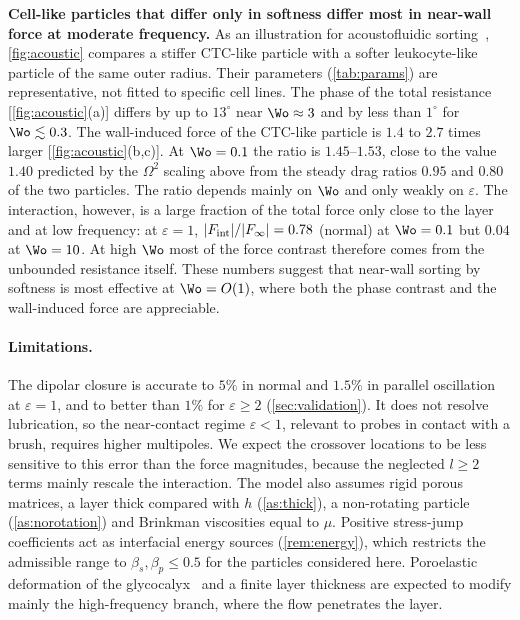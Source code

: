 \textbf{Cell-like particles that differ only in softness differ most in near-wall force at moderate frequency.} As an
illustration for acoustofluidic sorting~\cite{wu2019acoustofluidic,hossein2023review}, \cref{fig:acoustic} compares a
stiffer CTC-like particle with a softer leukocyte-like particle of the same outer radius. Their parameters
(\cref{tab:params}) are representative, not fitted to specific cell lines. The phase of the total resistance
[\cref{fig:acoustic}(a)] differs by up to $13^\circ$ near $\Wo\approx3$ and by less than $1^\circ$ for $\Wo\lesssim0.3$.
The wall-induced force of the CTC-like particle is $1.4$ to $2.7$ times larger [\cref{fig:acoustic}(b,c)]. At $\Wo=0.1$ the
ratio is $1.45$--$1.53$, close to the value $1.40$ predicted by the $\Omega^2$ scaling above from the steady drag ratios
$0.95$ and $0.80$ of the two particles. The ratio depends mainly on $\Wo$ and only weakly on $\varepsilon$. The interaction,
however, is a large fraction of the total force only close to the layer and at low frequency: at $\varepsilon=1$,
$|F_{\rm int}|/|F_\infty|=0.78$ (normal) at $\Wo=0.1$ but $0.04$ at $\Wo=10$. At high $\Wo$ most of the force contrast
therefore comes from the unbounded resistance itself. These numbers suggest that near-wall sorting by softness is most
effective at $\Wo=O(1)$, where both the phase contrast and the wall-induced force are appreciable. 

\paragraph*{Limitations.}
The dipolar closure is accurate to $5\%$ in normal and $1.5\%$ in parallel oscillation at $\varepsilon=1$, and to better
than $1\%$ for $\varepsilon\ge2$ (\cref{sec:validation}). It does not resolve lubrication, so the near-contact regime
$\varepsilon<1$, relevant to probes in contact with a brush, requires higher multipoles. We expect the crossover locations
to be less sensitive to this error than the force magnitudes, because the neglected $l\ge2$ terms mainly rescale the
interaction.  The model also
assumes rigid porous matrices, a layer thick compared with $h$ (\cref{as:thick}), a non-rotating particle
(\cref{as:norotation}) and Brinkman viscosities equal to $\mu$. Positive stress-jump coefficients act as interfacial energy sources (\cref{rem:energy}), which restricts the
admissible range to $\beta_s,\beta_p\le0.5$ for the particles considered here. Poroelastic deformation of the glycocalyx~\cite{batalha2026elasto} and a finite layer thickness are expected to
modify mainly the high-frequency branch, where the flow penetrates the layer.
